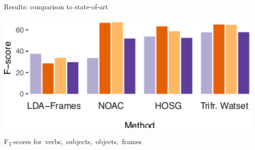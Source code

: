 \begin{frame}{Results: comparison to state-of-art}

\begin{center}	
\includegraphics[width=1.0\textwidth]{figures/frames2}
\end{center}


F\textsubscript{1}-scores for \,verbs, \,subjects, \,objects, \,frames

\end{frame}

